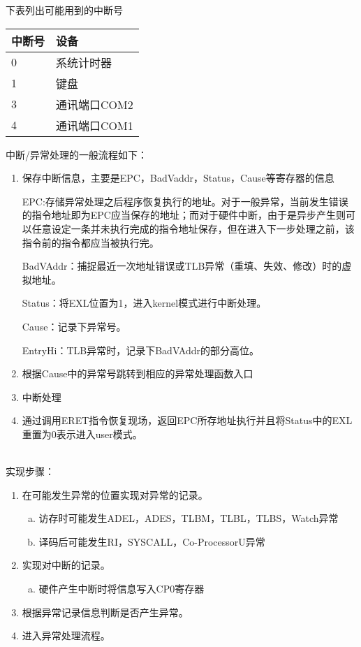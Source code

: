 下表列出可能用到的中断号

\begin{table}[H]
\centering
\begin{tabular}{ll}
\hline
中断号&设备\\
\hline
0&系统计时器\\
1&键盘\\
3&通讯端口COM2\\
4&通讯端口COM1\\
\hline
\end{tabular}
\end{table}

中断/异常处理的一般流程如下：

\begin{enumerate}[(1)]
\item 保存中断信息，主要是EPC，BadVaddr，Status，Cause等寄存器的信息

\qquad EPC:存储异常处理之后程序恢复执行的地址。对于一般异常，当前发生错误的指令地址即为EPC应当保存的地址；而对于硬件中断，由于是异步产生则可以任意设定一条并未执行完成的指令地址保存，但在进入下一步处理之前，该指令前的指令都应当被执行完。

\qquad BadVAddr：捕捉最近一次地址错误或TLB异常（重填、失效、修改）时的虚拟地址。

\qquad Status：将EXL位置为1，进入kernel模式进行中断处理。

\qquad Cause：记录下异常号。

\qquad EntryHi：TLB异常时，记录下BadVAddr的部分高位。

\item 根据Cause中的异常号跳转到相应的异常处理函数入口

\item 中断处理

\item 通过调用ERET指令恢复现场，返回EPC所存地址执行并且将Status中的EXL重置为0表示进入user模式。

\end{enumerate}

\quad \\
实现步骤：

\begin{enumerate}[(1)]
\item 在可能发生异常的位置实现对异常的记录。

\begin{enumerate}[(a)]
\item 访存时可能发生ADEL，ADES，TLBM，TLBL，TLBS，Watch异常

\item 译码后可能发生RI，SYSCALL，Co-ProcessorU异常
\end{enumerate}
\item 实现对中断的记录。

\begin{enumerate}[(a)]
\item 硬件产生中断时将信息写入CP0寄存器
\end{enumerate}

\item 根据异常记录信息判断是否产生异常。

\item 进入异常处理流程。

\end{enumerate}

